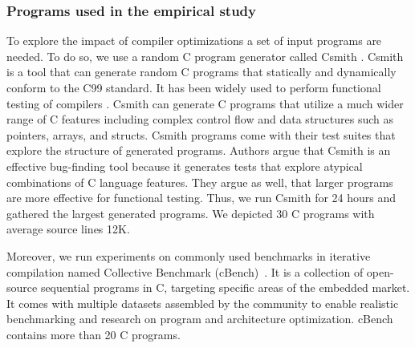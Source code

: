 \subsubsection{Programs used in the empirical study}
To explore the impact of compiler optimizations a set of input programs are needed. 
To do so, we use a random C program generator called Csmith \cite{yang2011finding}.
Csmith is a tool that can generate random C programs that statically and dynamically conform to the C99 standard. It has been widely used to perform functional testing of compilers \cite{le2014compiler} \cite{nagai2013scaling}. Csmith can generate C programs that utilize a much wider range of C features including complex control flow and data structures such as pointers, arrays, and structs. Csmith programs come with their test suites that explore the structure of generated programs. 
Authors argue that Csmith is an effective bug-finding tool because it generates tests that explore atypical combinations of C language features. They argue as well, that larger programs are more effective for functional testing. Thus, we run Csmith for 24 hours and gathered the largest generated programs. We depicted 30 C programs with average source lines 12K.

Moreover, we run experiments on commonly used benchmarks in iterative compilation named Collective Benchmark (cBench)~\cite{fursin2009collective}. It is a collection of open-source sequential programs in C, targeting specific areas of the embedded market. It comes with multiple datasets assembled by the community to enable realistic benchmarking and research on program and architecture optimization. cBench contains more than 20 C programs. 

